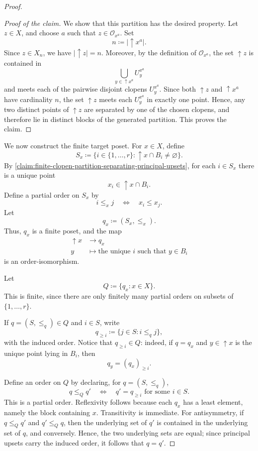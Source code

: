 \documentclass[12pt]{amsart}
\theoremstyle{plain}
\theoremstyle{definition}
\renewcommand{\u}{{\uparrow}}
\begin{document}
\begin{proof}
\begin{proof}[Proof of the claim]
        We show that this partition has the desired property. Let $z\in X$, and choose
        $a$ such that $z\in\mathcal{O}_{x^a}$. Set
        \[
            n\coloneqq \lvert{\u}x^a\rvert.
        \]
        Since $z\in X_n$, we have $\lvert{\u}z\rvert=n$. Moreover, by the definition of
        $\mathcal{O}_{x^a}$, the set ${\u}z$ is contained in
        \[
            \bigcup_{y\in{\u}x^a}U^{x^a}_y
        \]
        and meets each of the pairwise disjoint clopens $U^{x^a}_y$. Since both ${\u}z$
        and ${\u}x^a$ have cardinality $n$, the set ${\u}z$ meets each $U^{x^a}_y$ in
        exactly one point. Hence, any two distinct points of ${\u}z$ are separated by one of
        the chosen clopens, and therefore lie in distinct blocks of the generated partition.
        This proves the claim.
    \end{proof}

    We now construct the finite target poset. For $x\in X$, define
    \[
        S_x\coloneqq \{i\in\{1,\dots,r\}:{\u}x\cap B_i\neq\varnothing\}.
    \]
    By \cref{claim:finite-clopen-partition-separating-principal-upsets}, for each $i\in S_x$ there is a unique point
    \[
        x_i\in{\u}x\cap B_i.
    \]
    Define a partial order on $S_x$ by
    \[
        i\leq_x j
        \quad\Longleftrightarrow\quad
        x_i\leq x_j.
    \]
    Let
    \[
        q_x\coloneqq (S_x,\leq_x).
    \]
    Thus, $q_x$ is a finite poset, and the map
    \begin{align*}
        {\u}x &\longrightarrow q_x\\
        y &\longmapsto \text{the unique }i\text{ such that }y\in B_i
    \end{align*}
    is an order-isomorphism.

    Let
    \[
        Q\coloneqq \{q_x:x\in X\}.
    \]
    This is finite, since there are only finitely many partial orders on subsets of
    $\{1,\dots,r\}$.

    If $q=(S,\leq_q)\in Q$ and $i\in S$, write
    \[
        q_{\geq i}\coloneqq \{j\in S:i\leq_q j\},
    \]
    with the induced order. Notice that $q_{\geq i}\in Q$: indeed, if $q=q_x$ and
    $y\in{\u}x$ is the unique point lying in $B_i$, then
    \[
        q_y=(q_x)_{\geq i}.
    \]

    Define an order on $Q$ by declaring, for $q=(S,\leq_q)$,
    \[
        q\leq_Q q'
        \quad\Longleftrightarrow\quad
        q'=q_{\geq i}\text{ for some }i\in S.
    \]
    This is a partial order. Reflexivity follows because each $q_x$ has a least element,
    namely the block containing $x$. Transitivity is immediate. For antisymmetry, if
    $q\leq_Q q'$ and $q'\leq_Q q$, then the underlying set of $q'$ is contained in the
    underlying set of $q$, and conversely. Hence, the two underlying sets are equal; since
    principal upsets carry the induced order, it follows that $q=q'$.


\end{proof}
\end{document}
